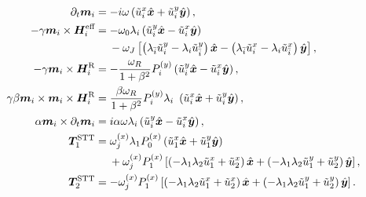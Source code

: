 \begin{subequations}
\label{eq:LLGS_Fourier_terms}
\begin{align}
    \partial_t\mathbold{m}_i &= -i\omega\left( \tilde{u}^x_i\mathbold{\hat{x}} + \tilde{u}^y_i \mathbold{\hat{y}} \right), \label{eq:LLGS_linear_u}\\
    \nonumber -\gamma\mathbold{m}_i\times\mathbold{H}^{\text{eff}}_i &= - \omega_0\lambda_i\left( \tilde{u}^y_i\mathbold{\hat{x}} - \tilde{u}^x_i \mathbold{\hat{y}} \right) \\
    &\hspace{4.5mm }- \omega_J\left[ \left(\lambda_{\bar{i}}\tilde{u}^y_i-\lambda_i\tilde{u}^y_{\bar{i}}\right)\mathbold{\hat{x}} - \left(\lambda_{\bar{i}}\tilde{u}^x_i-\lambda_i\tilde{u}^x_{\bar{i}}\right)\mathbold{\hat{y}} \right], \\
    -\gamma\mathbold{m}_i\times \mathbold{H}^{\text{R}}_i &= -\frac{\omega_R}{1+\beta^2} P^{(y)}_i \left( \tilde{u}^y_i\mathbold{\hat{x}} - \tilde{u}^x_i \mathbold{\hat{y}} \right), \label{eq:LLGS_cross_u} \\
    \gamma\beta\mathbold{m}_i\times\mathbold{m}_i\times\mathbold{H}^{\text{R}}_i &= \frac{\beta\omega_R}{1+\beta^2} P^{(y)}_i \lambda_i\ \left( \tilde{u}^x_i\mathbold{\hat{x}} + \tilde{u}^y_i\mathbold{\hat{y}} \right), \\
    \alpha\mathbold{m}_i\times\partial_t\mathbold{m}_i &= i\alpha \omega \lambda_i \left( \tilde{u}^y_i\mathbold{\hat{x}} - \tilde{u}^x_i \mathbold{\hat{y}} \right), \\
    \nonumber \mathbold{T}^{\text{STT}}_1 &= \omega^{(x)}_j \lambda_1 P^{(x)}_0 \left( \tilde{u}^x_1\mathbold{\hat{x}} + \tilde{u}^y_1 \mathbold{\hat{y}} \right) \\
    &\hspace{4.5mm} +\omega^{(x)}_jP^{(x)}_1\left[\left(-\lambda_1\lambda_2\tilde{u}^x_1+ \tilde{u}^x_{2}\right)\mathbold{\hat{x}} + \left(-\lambda_1\lambda_2\tilde{u}^y_1+ \tilde{u}^y_{2}\right)\mathbold{\hat{y}}\right], \\
    \mathbold{T}^{\text{STT}}_2 &= -\omega^{(x)}_jP^{(x)}_1\left[\left(-\lambda_1\lambda_2\tilde{u}^x_1+ \tilde{u}^x_{2}\right)\mathbold{\hat{x}} + \left(-\lambda_1\lambda_2\tilde{u}^y_1+ \tilde{u}^y_{2}\right)\mathbold{\hat{y}}\right].
\end{align}
\end{subequations}
